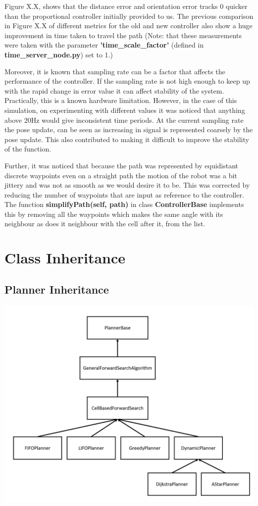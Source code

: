 \documentclass[a4paper,12pt]{article}
\begin{document}
		Figure X.X, shows that the distance error and orientation error tracks 0 quicker than the proportional controller initially provided to us. The previous comparison in Figure X.X of different metrics for the old and new controller also show a huge improvement in time taken to travel the path (Note: that these measurements were taken with the parameter \textbf{'time\_scale\_factor'} (defined in \textbf{time\_server\_node.py}) set to 1.)
		
		Moreover, it is known that sampling rate can be a factor that affects the performance of the controller. If the sampling rate is not high enough to keep up with the rapid change in error value it can affect stability of the system. Practically, this is a known hardware limitation. However, in the case of this simulation, on experimenting with different values it was noticed that anything above 20Hz would give inconsistent time periods. At the current sampling rate the pose update, can be seen as increasing in signal is represented coarsely by the pose update. This also contributed to making it difficult to improve the stability of the function.
		
		Further, it was noticed that because the path was represented by equidistant discrete waypoints even on a straight path the motion of the robot was a bit jittery and was not as smooth as we would desire it to be. This was corrected by reducing the number of waypoints that are input as reference to the controller. The function \textbf{simplifyPath(self, path)} in class \textbf{ControllerBase} implements this by removing all the waypoints which makes the same angle with its neighbour as does it neighbour with the cell after it, from the list.
	
	
	\newpage
	
	\appendix
	\appendixpage
	\addappheadtotoc
	\section{Class Inheritance}
	\subsection{Planner Inheritance}
	\label{appendix:planner}
	\includegraphics[scale=0.6]{images/planner_inheritance.png}
\end{document}

